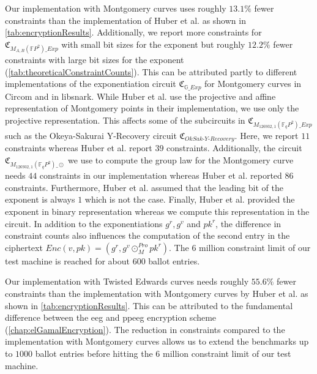 Our implementation with Montgomery curves uses roughly $13.1\%$ fewer constraints than the implementation of Huber et al. as shown in \cref{tab:encryptionResults}.
Additionally, we report more constraints for $\mathfrak{C}_{M_{A,B}(\mathbb{F}P^2)\_Exp}$ with small bit sizes for the exponent but roughly $12.2\%$ fewer constraints with large bit sizes for the exponent (\cref{tab:theoreticalConstraintCounts}).
This can be attributed partly to different implementations of the exponentiation circuit $\mathfrak{C}_{\mathbb{G}\_Exp}$ for Montgomery curves in Circom and in libsnark.
While Huber et al. use the projective and affine representation of Montgomery points in their implementation, we use only the projective representation.
This affects some of the subcircuits in $\mathfrak{C}_{M_{126932, 1}(\mathbb{F}_qP^2)\_Exp}$ such as the Okeya-Sakurai Y-Recovery circuit $\mathfrak{C}_{OkSak\text{-}Y\text{-}Recovery}$.
Here, we report $11$ constraints whereas Huber et al. report $39$ constraints.
Additionally, the circuit $\mathfrak{C}_{M_{126932, 1}(\mathbb{F}_qP^2)\_\odot}$ we use to compute the group law for the Montgomery curve needs $44$ constraints in our implementation whereas Huber et al. reported $86$ constraints.
Furthermore, Huber et al. assumed that the leading bit of the exponent is always $1$ which is not the case.
Finally, Huber et al. provided the exponent in binary representation whereas we compute this representation in the circuit.
In addition to the exponentiations $g^r, g^v$ and $pk^r$, the difference in constraint counts also influences the computation of the second entry in the ciphertext $Enc(v, pk)=(g^r, g^v \odot_M^{Pro} pk^r)$.
The $6$ million constraint limit of our test machine is reached for about $600$ ballot entries.

Our implementation with Twisted Edwards curves needs roughly $55.6\%$ fewer constraints than the implementation with Montgomery curves by Huber et al. as shown in \cref{tab:encryptionResults}.
This can be attributed to the fundamental difference between the \gls{eeg} and \gls{ppeeg} encryption scheme (\cref{chap:elGamalEncryption}).
The reduction in constraints compared to the implementation with Montgomery curves allows us to extend the benchmarks up to $1000$ ballot entries before hitting the $6$ million constraint limit of our test machine.

